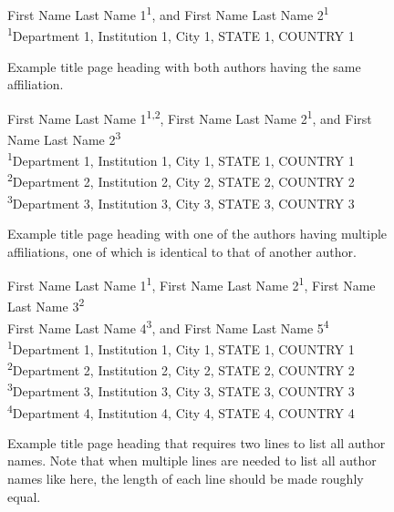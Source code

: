 \documentclass{wscpaperproc}
\theoremstyle{wsc}
\begin{document}
\vspace{22pt}

\begin{figure}[!htb]
\begin{center}
        First Name Last Name 1\textsuperscript{1}, and First Name Last Name 2\textsuperscript{1}\\[11pt]
		\textsuperscript{1}Department 1, Institution 1, City 1, STATE 1, COUNTRY 1
        \end{center}
        \caption{Example title page heading with both authors having the same affiliation.} \label{fig:single}
\end{figure}

\vspace{22pt}

\begin{figure}[!htb]
\begin{center}
		First Name Last Name 1\textsuperscript{1,2}, First Name Last Name 2\textsuperscript{1}, and First Name Last Name 2\textsuperscript{3}\\[11pt]
		\textsuperscript{1}Department 1, Institution 1, City 1, STATE 1, COUNTRY 1\\
		\textsuperscript{2}Department 2, Institution 2, City 2, STATE 2, COUNTRY 2\\
		\textsuperscript{3}Department 3, Institution 3, City 3, STATE 3, COUNTRY 3
        \end{center}
        \caption{Example title page heading with one of the authors having multiple affiliations, one of which is identical to that of another author.} \label{fig:same multiple}
\end{figure}

\vspace{22pt}

\begin{figure}[!htb]
\begin{center}
		First Name Last Name 1\textsuperscript{1}, First Name Last Name 2\textsuperscript{1},  First Name Last Name 3\textsuperscript{2}\\
            First Name Last Name 4\textsuperscript{3}, and First Name Last Name 5\textsuperscript{4}\\[11pt]
		\textsuperscript{1}Department 1, Institution 1, City 1, STATE 1, COUNTRY 1\\
		\textsuperscript{2}Department 2, Institution 2, City 2, STATE 2, COUNTRY 2\\
		\textsuperscript{3}Department 3, Institution 3, City 3, STATE 3, COUNTRY 3\\
		\textsuperscript{4}Department 4, Institution 4, City 4, STATE 4, COUNTRY 4
        \end{center}
        \caption{Example title page heading that requires two lines to list all author names. Note that when multiple lines are needed to list all author names like here, the length of each line should be made roughly equal.} \label{fig:two lines}
\end{figure}
\end{document}
